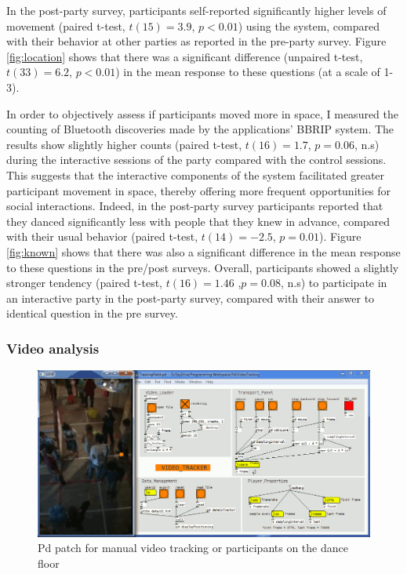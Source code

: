 \documentclass[a4paper,11pt]{article}
\begin{document}
{In the post-party survey, participants self-reported significantly higher levels of movement (paired t-test, $t(15)=3.9$, $p<0.01$) using the system, compared with their behavior at other parties as reported in the pre-party survey.
Figure \ref{fig:location} shows that there was a significant difference (unpaired t-test, $t(33)=6.2$, $p<0.01$) in the mean response to these questions (at a scale of 1-3).

In order to objectively assess if participants moved more in space, I measured the counting of Bluetooth discoveries made by the applications' BBRIP system.
The results show slightly higher counts (paired t-test, $t(16)=1.7$, $p=0.06$, n.s) during the interactive sessions of the party compared with the control sessions.
This suggests that the interactive components of the system facilitated greater participant movement in space, thereby offering more frequent opportunities for social interactions.
Indeed, in the post-party survey participants reported that they danced significantly less with people that they knew in advance, compared with their usual behavior (paired t-test, $t(14)=-2.5$, $p=0.01$).
Figure \ref{fig:known} shows that there was also a significant difference in the mean response to these questions in the pre/post surveys.
Overall, participants showed a slightly stronger tendency (paired t-test, $t(16)=1.46$ ,$p=0.08$, n.s) to participate in an interactive party in the post-party survey, compared with their answer to identical question in the pre survey.

\subsubsection{Video analysis}\label{exp1:results:video}

\begin{figure}[!htb]
	\includegraphics[width=\linewidth]{tracking}
        \caption{Pd patch for manual video tracking or participants on the dance floor}\label{fig:tracking}
\end{figure}

}
\end{document}
